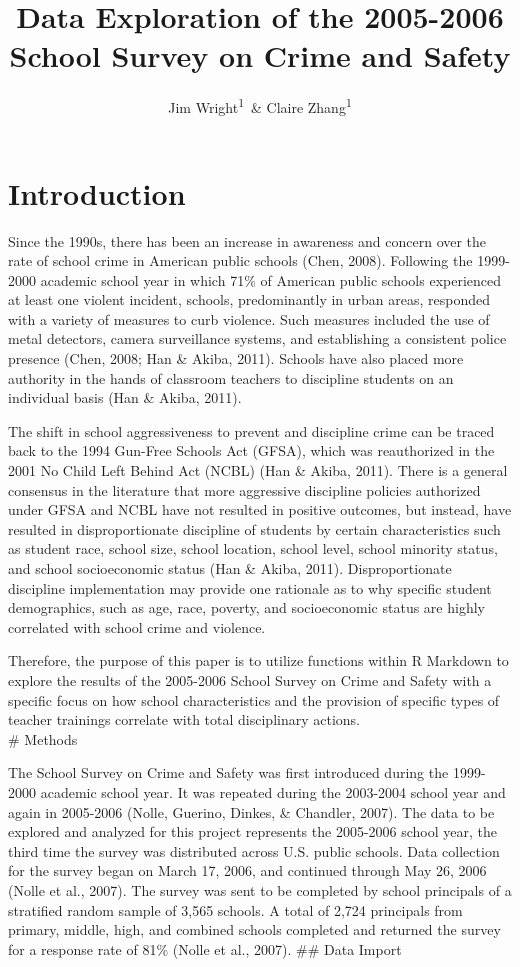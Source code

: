 \documentclass[
  man, fleqn, noextraspace]{apa6}
\affiliation{
\vspace{0.5cm}
\textsuperscript{1} University of Oregon}
\title{Data Exploration of the 2005-2006 School Survey on Crime and Safety}
\author{Jim Wright\textsuperscript{1}~\& Claire Zhang\textsuperscript{1}}
\date{}
\begin{document}
\maketitle

\hypertarget{introduction}{%
\section{Introduction}\label{introduction}}

Since the 1990s, there has been an increase in awareness and concern over the rate of school crime in American public schools (Chen, 2008). Following the 1999-2000 academic school year in which 71\% of American public schools experienced at least one violent incident, schools, predominantly in urban areas, responded with a variety of measures to curb violence. Such measures included the use of metal detectors, camera surveillance systems, and establishing a consistent police presence (Chen, 2008; Han \& Akiba, 2011). Schools have also placed more authority in the hands of classroom teachers to discipline students on an individual basis (Han \& Akiba, 2011).

The shift in school aggressiveness to prevent and discipline crime can be traced back to the 1994 Gun-Free Schools Act (GFSA), which was reauthorized in the 2001 No Child Left Behind Act (NCBL) (Han \& Akiba, 2011). There is a general consensus in the literature that more aggressive discipline policies authorized under GFSA and NCBL have not resulted in positive outcomes, but instead, have resulted in disproportionate discipline of students by certain characteristics such as student race, school size, school location, school level, school minority status, and school socioeconomic status (Han \& Akiba, 2011). Disproportionate discipline implementation may provide one rationale as to why specific student demographics, such as age, race, poverty, and socioeconomic status are highly correlated with school crime and violence.

Therefore, the purpose of this paper is to utilize functions within R Markdown to explore the results of the 2005-2006 School Survey on Crime and Safety with a specific focus on how school characteristics and the provision of specific types of teacher trainings correlate with total disciplinary actions.\\
\# Methods

The School Survey on Crime and Safety was first introduced during the 1999-2000 academic school year. It was repeated during the 2003-2004 school year and again in 2005-2006 (Nolle, Guerino, Dinkes, \& Chandler, 2007). The data to be explored and analyzed for this project represents the 2005-2006 school year, the third time the survey was distributed across U.S. public schools. Data collection for the survey began on March 17, 2006, and continued through May 26, 2006 (Nolle et al., 2007). The survey was sent to be completed by school principals of a stratified random sample of 3,565 schools. A total of 2,724 principals from primary, middle, high, and combined schools completed and returned the survey for a response rate of 81\% (Nolle et al., 2007).
\#\# Data Import
\end{document}
